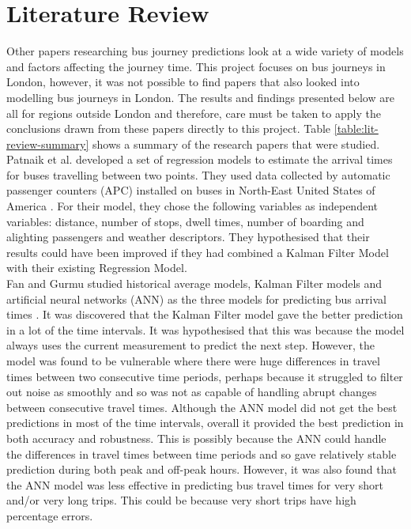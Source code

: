 \section{Literature Review}

Other papers researching bus journey predictions look at a wide variety of models and factors affecting the journey time. This project focuses on bus journeys in London, however, it was not possible to find papers that also looked into modelling bus journeys in London. The results and findings presented below are all for regions outside London and therefore, care must be taken to apply the conclusions drawn from these papers directly to this project. Table \ref{table:lit-review-summary} shows a summary of the research papers that were studied. \\

Patnaik et al. developed a set of regression models to estimate the arrival times for buses travelling between two points. They used data collected by automatic passenger counters (APC) installed on buses in North-East United States of America \cite{apc-estimation}. For their model, they chose the following variables as independent variables: distance, number of stops, dwell times, number of boarding and alighting passengers and weather descriptors. They hypothesised that their results could have been improved if they had combined a Kalman Filter Model with their existing Regression Model. \\

Fan and Gurmu studied historical average models, Kalman Filter models and artificial neural networks (ANN) as the three models for predicting bus arrival times \cite{dynamic-gps}. It was discovered that the Kalman Filter model gave the better prediction in a lot of the time intervals. It was hypothesised that this was because the model always uses the current measurement to predict the next step. However, the model was found to be vulnerable where there were huge differences in travel times between two consecutive time periods, perhaps because it struggled to filter out noise as smoothly and so was not as capable of handling abrupt changes between consecutive travel times. Although the ANN model did not get the best predictions in most of the time intervals, overall it provided the best prediction in both accuracy and robustness. This is possibly because the ANN could handle the differences in travel times between time periods and so gave relatively stable prediction during both peak and off-peak hours. However, it was also found that the ANN model was less effective in predicting bus travel times for very short and/or very long trips. This could be because very short trips have high percentage errors. \\

